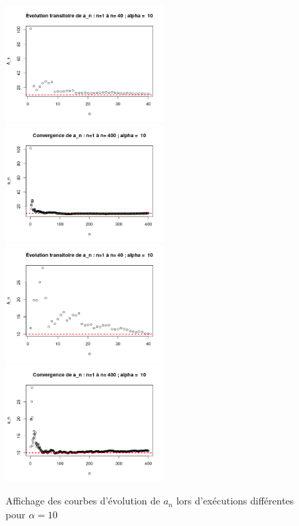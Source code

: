 \documentclass{article}
\begin{document}
\begin{figure}[!h]
\begin{center}
\includegraphics[width=6cm]{plot_graphique_transi_1_a10}
\includegraphics[width=6cm]{plot_graphique_conv_1_a10}
\includegraphics[width=6cm]{plot_graphique_transi_2_a10}
\includegraphics[width=6cm]{plot_graphique_conv_2_a10}
\caption{Affichage des courbes d'évolution de $a_n$ lors d'exécutions différentes pour $\alpha=10$}
\end{center}
\end{figure}

\clearpage
\end{document}
